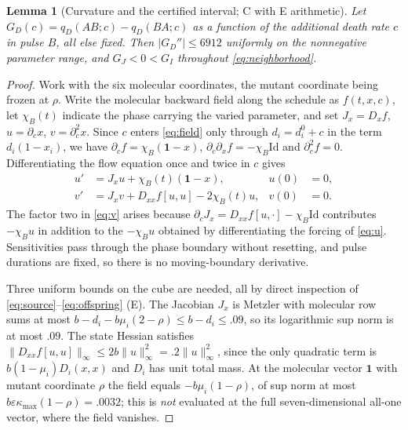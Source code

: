 \documentclass[11pt]{article}
\newtheorem{lemma}[theorem]{Lemma}
\theoremstyle{remark}
\newcommand{\one}{\mathbf 1}
\newcommand{\eps}{\varepsilon}
\newcommand{\Id}{\mathrm{Id}}
\begin{document}
\begin{lemma}[Curvature and the certified interval; C with E arithmetic]
\label{lem:curvature}
Let $G_D(c)=q_D(AB;c)-q_D(BA;c)$ as a function of the additional death rate $c$
in pulse $B$, all else fixed. Then $|G_D''|\le6912$ uniformly on the nonnegative
parameter range, and $G_J<0<G_I$ throughout \eqref{eq:neighborhood}.
\end{lemma}

\begin{proof}
Work with the six molecular coordinates, the mutant coordinate being frozen at
$\rho$. Write the molecular backward field along the schedule as $f(t,x,c)$, let
$\chi_B(t)$ indicate the phase carrying the varied parameter, and set $J_x=D_xf$,
$u=\partial_cx$, $v=\partial_c^2x$. Since $c$ enters \eqref{eq:field} only through
$d_i=d_i^0+c$ in the term $d_i(1-x_i)$, we have $\partial_cf=\chi_B(\one-x)$,
$\partial_c\partial_xf=-\chi_B\Id$ and $\partial_c^2f=0$. Differentiating the
flow equation once and twice in $c$ gives
\begin{align}
 u'&=J_xu+\chi_B(t)(\one-x),&u(0)&=0,\label{eq:u}\\
 v'&=J_xv+D_{xx}f[u,u]-2\chi_B(t)u,&v(0)&=0.\label{eq:v}
\end{align}
The factor two in \eqref{eq:v} arises because
$\partial_cJ_x=D_{xx}f[u,\cdot]-\chi_B\Id$ contributes $-\chi_Bu$ in addition to
the $-\chi_Bu$ obtained by differentiating the forcing of \eqref{eq:u}.
Sensitivities pass through the phase boundary without resetting, and pulse
durations are fixed, so there is no moving-boundary derivative.

Three uniform bounds on the cube are needed, all by direct inspection of
\eqref{eq:source}--\eqref{eq:offspring} \textup{(E)}. The Jacobian $J_x$ is
Metzler with molecular row sums at most $b-d_i-b\mu_i(2-\rho)\le b-d_i\le.09$, so
its logarithmic sup norm is at most $.09$. The state Hessian satisfies
$\|D_{xx}f[u,u]\|_\infty\le2b\|u\|_\infty^2=.2\|u\|_\infty^2$, since the only
quadratic term is $b(1-\mu_i)D_i(x,x)$ and $D_i$ has unit total mass. At the
molecular vector $\one$ with mutant coordinate $\rho$ the field equals
$-b\mu_i(1-\rho)$, of sup norm at most $b\eps\kappa_{\max}(1-\rho)=.0032$; this
is \emph{not} evaluated at the full seven-dimensional all-one vector, where the
field vanishes.


\end{proof}
\end{document}
